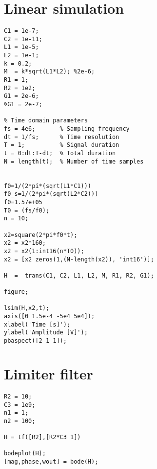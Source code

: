 \newpage
\section{Linear simulation}
\begin{lstlisting}
C1 = 1e-7;
C2 = 1e-11;
L1 = 1e-5;
L2 = 1e-1;
k = 0.2;
M  = k*sqrt(L1*L2); %2e-6;
R1 = 1;
R2 = 1e2;
G1 = 2e-6;
%G1 = 2e-7;

% Time domain parameters
fs = 4e6;       % Sampling frequency
dt = 1/fs;      % Time resolution
T = 1;          % Signal duration
t = 0:dt:T-dt;  % Total duration
N = length(t);  % Number of time samples


f0=1/(2*pi*(sqrt(L1*C1)))
f0_s=1/(2*pi*(sqrt(L2*C2)))
f0=1.57e+05
T0 = (fs/f0);
n = 10;

x2=square(2*pi*f0*t);
x2 = x2*160;
x2 = x2(1:int16(n*T0));
x2 = [x2 zeros(1,(N-length(x2)), 'int16')];

H  =  trans(C1, C2, L1, L2, M, R1, R2, G1);

figure;

lsim(H,x2,t);
axis([0 1.5e-4 -5e4 5e4]);
xlabel('Time [s]');
ylabel('Amplitude [V]');
pbaspect([2 1 1]);
\end{lstlisting}

\section{Limiter filter}
\begin{lstlisting}
R2 = 10;
C3 = 1e9;
n1 = 1;
n2 = 100;

H = tf([R2],[R2*C3 1])

bodeplot(H);
[mag,phase,wout] = bode(H);
\end{lstlisting}

\newpage
